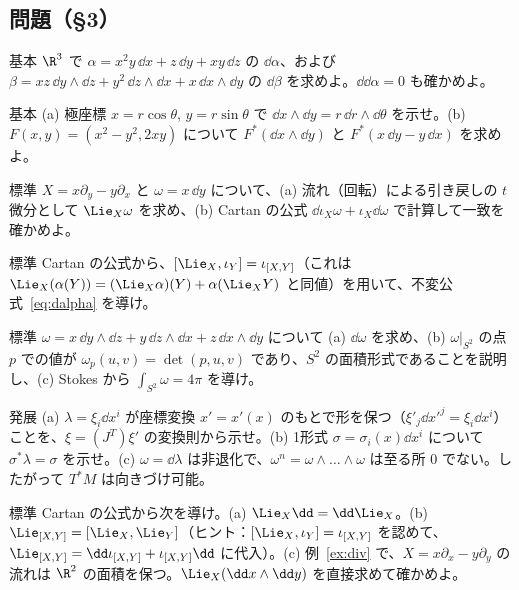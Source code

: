 \subsection*{問題（§3）}
\begin{prob}{基本}\label{p:dcalc}
$\R^3$ で $\alpha=x^2y\,\dd x+z\,\dd y+xy\,\dd z$ の $\dd\alpha$、および $\beta=xz\,\dd y\wedge\dd z+y^2\,\dd z\wedge\dd x+x\,\dd x\wedge\dd y$ の $\dd\beta$ を求めよ。$\dd\dd\alpha=0$ も確かめよ。
\end{prob}
\begin{prob}{基本}\label{p:pullback}
(a) 極座標 $x=r\cos\theta$, $y=r\sin\theta$ で $\dd x\wedge\dd y=r\,\dd r\wedge\dd\theta$ を示せ。(b) $F(x,y)=(x^2-y^2,2xy)$ について $F^*(\dd x\wedge\dd y)$ と $F^*(x\,\dd y-y\,\dd x)$ を求めよ。
\end{prob}
\begin{prob}{標準}\label{p:cartanex}
$X=x\partial_y-y\partial_x$ と $\omega=x\,\dd y$ について、(a) 流れ（回転）による引き戻しの $t$ 微分として $\Lie_X\omega$ を求め、(b) Cartan の公式 $\dd\iota_X\omega+\iota_X\dd\omega$ で計算して一致を確かめよ。
\end{prob}
\begin{prob}{標準}\label{p:invariant}
Cartan の公式から、$[\Lie_X,\iota_Y]=\iota_{[X,Y]}$（これは $\Lie_X(\alpha(Y))=(\Lie_X\alpha)(Y)+\alpha(\Lie_XY)$ と同値）を用いて、不変公式~\eqref{eq:dalpha} を導け。
\end{prob}
\begin{prob}{標準}\label{p:area}
$\omega=x\,\dd y\wedge\dd z+y\,\dd z\wedge\dd x+z\,\dd x\wedge\dd y$ について (a) $\dd\omega$ を求め、(b) $\omega|_{S^2}$ の点 $p$ での値が $\omega_p(u,v)=\det(p,u,v)$ であり、$S^2$ の面積形式であることを説明し、(c) Stokes から $\int_{S^2}\omega=4\pi$ を導け。
\end{prob}
\begin{prob}{発展}\label{p:canon}
(a) $\lambda=\xi_i\dd x^i$ が座標変換 $x'=x'(x)$ のもとで形を保つ（$\xi'_j\dd x'^j=\xi_i\dd x^i$）ことを、$\xi=(J^{T})\xi'$ の変換則から示せ。(b) 1形式 $\sigma=\sigma_i(x)\dd x^i$ について $\sigma^*\lambda=\sigma$ を示せ。(c) $\omega=\dd\lambda$ は非退化で、$\omega^{n}=\omega\wedge\dots\wedge\omega$ は至る所 $0$ でない。したがって $T^*M$ は向きづけ可能。
\end{prob}
\begin{prob}{標準}\label{p:liebracket}
Cartan の公式から次を導け。(a) $\Lie_X\dd=\dd\Lie_X$。(b) $\Lie_{[X,Y]}=[\Lie_X,\Lie_Y]$（ヒント：$[\Lie_X,\iota_Y]=\iota_{[X,Y]}$ を認めて、$\Lie_{[X,Y]}=\dd\iota_{[X,Y]}+\iota_{[X,Y]}\dd$ に代入）。(c) 例~\ref{ex:div} で、$X=x\partial_x-y\partial_y$ の流れは $\R^2$ の面積を保つ。$\Lie_X(\dd x\wedge\dd y)$ を直接求めて確かめよ。
\end{prob}
